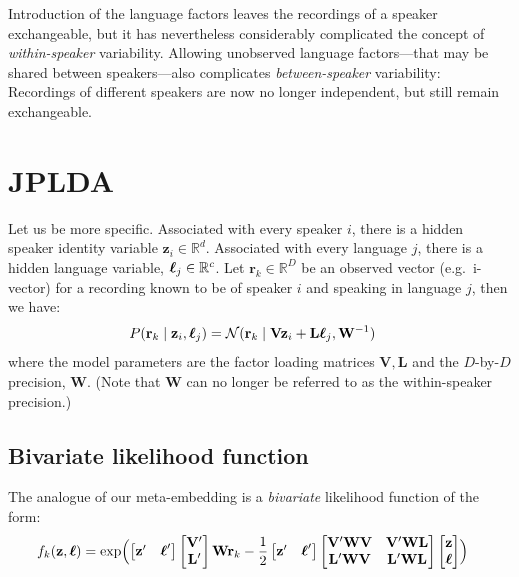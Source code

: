\documentclass[a4paper,oneside,12pt,english]{report}
\def\Vmat{\mathbf{V}}
\def\zvec{\mathbf{z}}
\def\ND{\mathcal{N}}
\def\R{\mathbb{R}}
\def\Lmat{\mathbf{L}}
\def\Wmat{\mathbf{W}}
\def\rvec{\mathbf{r}}
\def\bmat#1{\begin{bmatrix}#1\end{bmatrix}}
\begin{document}
Introduction of the language factors leaves the recordings of a speaker exchangeable, but it has nevertheless considerably complicated the concept of \emph{within-speaker} variability. Allowing unobserved language factors---that may be shared between speakers---also complicates \emph{between-speaker} variability: Recordings of different speakers are now no longer independent, but still remain exchangeable.

\section{JPLDA}
Let us be more specific. Associated with every speaker $i$, there is a hidden speaker identity variable $\zvec_i\in\R^d$. Associated with every language $j$, there is a hidden language variable, $\ellvec_j\in\R^c$. Let $\rvec_k\in\R^D$ be an observed vector (e.g.\ i-vector) for a recording known to be of speaker $i$ and speaking in language $j$, then we have:
\begin{align}
P(\rvec_k\mid\zvec_i,\ellvec_j) &= \ND(\rvec_k\mid \Vmat\zvec_i + \Lmat\ellvec_j,\Wmat^{-1})
\end{align} 
where the model parameters are the factor loading matrices $\Vmat,\Lmat$ and the $D$-by-$D$ precision, $\Wmat$. (Note that $\Wmat$ can no longer be referred to as the within-speaker precision.)

\subsection{Bivariate likelihood function}
The analogue of our meta-embedding is a \emph{bivariate} likelihood function of the form:
\begin{align}
f_k(\zvec,\ellvec) &= \exp\Bigl(
\bmat{\zvec'& \ellvec'}\bmat{\Vmat' \\ \Lmat'}\Wmat\rvec_k - \frac12\bmat{\zvec'& \ellvec'}
\bmat{\Vmat'\Wmat\Vmat & \Vmat'\Wmat\Lmat \\ \Lmat'\Wmat\Vmat & \Lmat'\Wmat\Lmat}
\bmat{\zvec\\ \ellvec} 
\Bigr)
\end{align}
\end{document}
